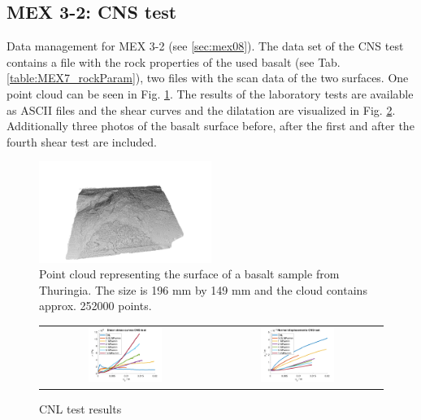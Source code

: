 \subsection{MEX 3-2: CNS test}\label{DataManMex3-2CNS}

Data management for MEX 3-2 (see \ref{sec:mex08}).
The data set of the CNS test contains a file with the rock properties of the used basalt (see Tab. \ref{table:MEX7_rockParam}), two files with the scan data of the two surfaces. One point cloud can be seen in Fig. \ref{fig:DataCNSBasaltPointCloud}. The results of the laboratory tests are available as ASCII files and the shear curves and the dilatation are visualized in Fig. \ref{fig:DataCNSBasaltLab}. Additionally three photos of the basalt surface before, after the first and after the fourth shear test are included. 

\begin{figure}[!ht]
\begin{center}
\includegraphics[width=0.5\textwidth]{./figures/MEX3-2PointCloud.png}
\end{center}
\caption{Point cloud representing the surface of a basalt sample from Thuringia. The size is 196 mm by 149 mm and the cloud contains approx. 252000 points.}
\label{fig:DataCNSBasaltPointCloud}
\end{figure}

\begin{figure}[!ht]
\begin{tabular}{cc}
\includegraphics[width=0.45\textwidth]{./figures/CNSShearCurvesAll.png}     
& 
\includegraphics[width=0.45\textwidth]{./figures/CNSDilatationAll.png} 
\end{tabular}
\caption{CNL test results}
\label{fig:DataCNSBasaltLab}
\end{figure}

